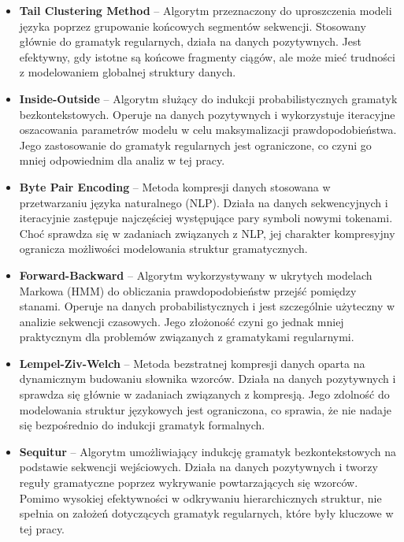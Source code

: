 \begin{itemize}  
    \item \textbf{Tail Clustering Method} -- Algorytm przeznaczony do uproszczenia modeli języka poprzez grupowanie końcowych segmentów sekwencji. Stosowany głównie do gramatyk regularnych, działa na danych pozytywnych. Jest efektywny, gdy istotne są końcowe fragmenty ciągów, ale może mieć trudności z modelowaniem globalnej struktury danych.  

    \item \textbf{Inside-Outside} -- Algorytm służący do indukcji probabilistycznych gramatyk bezkontekstowych. Operuje na danych pozytywnych i wykorzystuje iteracyjne oszacowania parametrów modelu w celu maksymalizacji prawdopodobieństwa. Jego zastosowanie do gramatyk regularnych jest ograniczone, co czyni go mniej odpowiednim dla analiz w tej pracy.  

    \item \textbf{Byte Pair Encoding} -- Metoda kompresji danych stosowana w przetwarzaniu języka naturalnego (NLP). Działa na danych sekwencyjnych i iteracyjnie zastępuje najczęściej występujące pary symboli nowymi tokenami. Choć sprawdza się w zadaniach związanych z NLP, jej charakter kompresyjny ogranicza możliwości modelowania struktur gramatycznych.  

    \item \textbf{Forward-Backward} -- Algorytm wykorzystywany w ukrytych modelach Markowa (HMM) do obliczania prawdopodobieństw przejść pomiędzy stanami. Operuje na danych probabilistycznych i jest szczególnie użyteczny w analizie sekwencji czasowych. Jego złożoność czyni go jednak mniej praktycznym dla problemów związanych z gramatykami regularnymi.  

    \item \textbf{Lempel-Ziv-Welch} -- Metoda bezstratnej kompresji danych oparta na dynamicznym budowaniu słownika wzorców. Działa na danych pozytywnych i sprawdza się głównie w zadaniach związanych z kompresją. Jego zdolność do modelowania struktur językowych jest ograniczona, co sprawia, że nie nadaje się bezpośrednio do indukcji gramatyk formalnych.  

    \item \textbf{Sequitur} -- Algorytm umożliwiający indukcję gramatyk bezkontekstowych na podstawie sekwencji wejściowych. Działa na danych pozytywnych i tworzy reguły gramatyczne poprzez wykrywanie powtarzających się wzorców. Pomimo wysokiej efektywności w odkrywaniu hierarchicznych struktur, nie spełnia on założeń dotyczących gramatyk regularnych, które były kluczowe w tej pracy.  
\end{itemize}  
 

